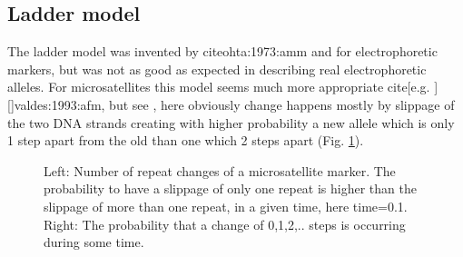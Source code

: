 \subsection{Ladder model}
The ladder model was invented by cite{ohta:1973:amm} and \cite{kimura:1978:ste} for electrophoretic markers, but was  not as good as expected in describing real electrophoretic alleles. For microsatellites this model seems
much more appropriate cite[e.g. ][]{valdes:1993:afm}, but see \cite{rienzo:1994:mps}, here obviously change happens mostly by slippage of the two DNA strands
creating with higher probability a new allele which is only 1 step apart from the old than one
which 2 steps apart (Fig. \ref{MSATFIG}). 
\begin{figure}[thb]
\begin{center}
\end{center}
\caption{Left: Number of repeat changes of a microsatellite marker. The probability to have a slippage of only one repeat is higher than the slippage of more than one repeat, in a given time, here time=0.1. Right: The probability that a change of 0,1,2,.. steps is occurring during some time.}
\label{MSATFIG}
\end{figure}

